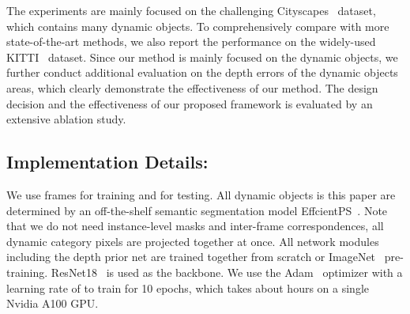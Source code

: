 \documentclass[runningheads]{llncs}
\begin{document}
The experiments are mainly focused on the challenging Cityscapes~\cite{Cityscapes} dataset, which contains many dynamic objects. To comprehensively compare with more state-of-the-art methods, we also report the performance on the widely-used KITTI~\cite{kitti} dataset. Since our method is mainly focused on the dynamic objects, we further conduct additional evaluation on the depth errors of the dynamic objects areas, which clearly demonstrate the effectiveness of our method. The design decision and the effectiveness of our proposed framework is evaluated by an extensive ablation study.

\subsection{Implementation Details: }We use frames  for training and  for testing. All dynamic objects is this paper are determined by an off-the-shelf semantic segmentation model EffcientPS~\cite{efficientps}. Note that we do not need instance-level masks and inter-frame correspondences, all dynamic category pixels are projected together at once. All network modules including the depth prior net  are trained together from scratch or ImageNet~\cite{imagenet} pre-training. ResNet18~\cite{resnet} is used as the backbone. We use the Adam~\cite{adam} optimizer with a learning rate of  to train for 10 epochs, which takes about  hours on a single Nvidia A100 GPU.
\end{document}
